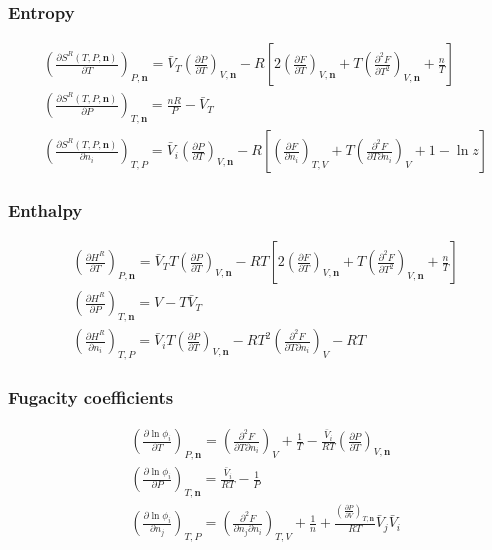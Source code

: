 \documentclass[internal,english]{sintefmemo2012}
\newcommand*{\pder}[2]{\left(\frac{\partial #1}{\partial #2}\right)}
\newcommand*{\pdder}[2]{\left(\frac{\partial^2 #1}{\partial #2^2}\right)}
\newcommand*{\pdcross}[3]{\left(\frac{\partial^2 #1}{\partial #2 \partial #3}\right)}
\numberwithin{equation}{section}
\begin{document}
\subsubsection*{Entropy}
\begin{align}
  \label{eq:S^R_T}
  & \pder{S^R(T,P,\textbf{n})}{T}_{P,\textbf{n}} = \bar{V}_T \pder{P}{T}_{V,\textbf{n}} - R \left[2\pder{F}{T}_{V,\textbf{n}} + T \pdder{F}{T}_{V,\textbf{n}} + \frac{n}{T} \right] \\
  \label{eq:S^R_P}
  & \pder{S^R(T,P,\textbf{n})}{P}_{T,\textbf{n}} = \frac{nR}{P} - \bar{V}_T \\
  \label{eq:S^R_i}
  & \pder{S^R(T,P,\textbf{n})}{n_i}_{T,P} = \bar{V}_i
  \pder{P}{T}_{V,\textbf{n}} - R\left[ \pder{F}{n_i}_{T,V} +
    T\pdcross{F}{T}{n_i}_V + 1 - \ln z \right]
\end{align}

\subsubsection*{Enthalpy}
\begin{align}
  \label{eq:H^R_T}
  & \pder{H^R}{T}_{P, \textbf{n}} = \bar{V}_T T \pder{P}{T}_{V,\textbf{n}} - RT \left[ 2\pder{F}{T}_{V,\textbf{n}} + T \pdder{F}{T}_{V,\textbf{n}} + \frac{n}{T} \right] \\
  \label{eq:H^R_P}
  & \pder{H^R}{P}_{T, \textbf{n}} = V - T \bar{V}_T \\
  \label{eq:H^R_i}
  & \pder{H^R}{n_i}_{T,P} = \bar{V}_i T \pder{P}{T}_{V,\textbf{n}}
  -RT^2 \pdcross{F}{T}{n_i}_V - RT
\end{align}

\subsubsection*{Fugacity coefficients}
\begin{align}
  \label{eq:lnphi_T}
  & \pder{\ln \phi_i}{T}_{P, \textbf{n}} = \pdcross{F}{T}{n_i}_V + \frac{1}{T} - \frac{\bar{V}_i}{RT}  \pder{P}{T}_{V,\textbf{n}} \\
  \label{eq:lnphi_P}
  & \pder{\ln \phi_i}{P}_{T, \textbf{n}} = \frac{\bar{V}_i}{RT} - \frac{1}{P} \\
  \label{eq:lnphi_i}
  & \pder{\ln \phi_i}{n_j}_{T, P} = \pdcross{F}{n_j}{n_i}_{T,V} +
  \frac{1}{n} + \frac{\pder{P}{V}_{T,\textbf{n}}}{RT} \bar{V}_j
  \bar{V}_i
\end{align}
\end{document}
